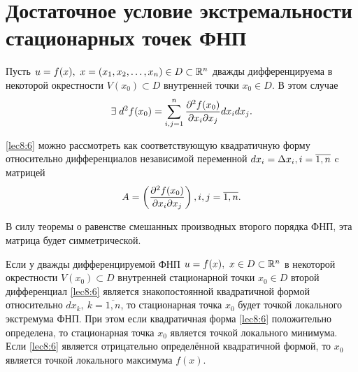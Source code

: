 \documentclass[../../main.tex]{subfiles}
\begin{document}
    \section{Достаточное условие экстремальности стационарных точек ФНП}
    Пусть $u = f(x),\ x = (x_1, x_2, \ldots, x_n) \in D \subset \mathbb{R}^n$
    дважды дифференцируема в некоторой окрестности $V(x_0) \subset D$
    внутренней точки $x_0 \in D$. В этом случае
    \begin{equation}
        \exists \; d^2f(x_0) = \sum_{i, j = 1}^n\frac{\partial ^2f(x_0)}{\partial x_i
        \partial x_j}dx_idx_j.
        \label{lec8:6}
    \end{equation}

    \eqref{lec8:6} можно рассмотреть как соответствующую квадратичную
    форму относительно дифференциалов независимой переменной $dx_i = \Delta x_i,
    i = \overline{1, n}$ c матрицей
    \[A = \left(\frac{\partial ^2f(x_0)}{\partial x_i\partial x_j}\right), i,j =
    \overline{1,n}. \]

    В силу теоремы о равенстве смешанных производных второго порядка ФНП,
    эта матрица будет симметрической.

    \begin{thm}
        Если у дважды дифференцируемой ФНП $u=f(x),\ x \in D \subset \mathbb{R}^n$
        в некоторой окрестности $V(x_0) \subset D$ внутренней стационарной
        точки $x_0 \in D$ второй дифференциал \eqref{lec8:6} является
        знакопостоянной квадратичной формой относительно $dx_k,\ k =
        \overline{1, n}$, то стационарная точка $x_0$ будет точкой локального
        экстремума ФНП. При этом если квадратичная форма \eqref{lec8:6}
        положительно определена, то стационарная точка $x_0$ является точкой
        локального минимума. Если \eqref{lec8:6} является отрицательно
        определённой квадратичной формой, то $x_0$ является точкой локального
        максимума $f(x)$.
    \end{thm}
\end{document}
